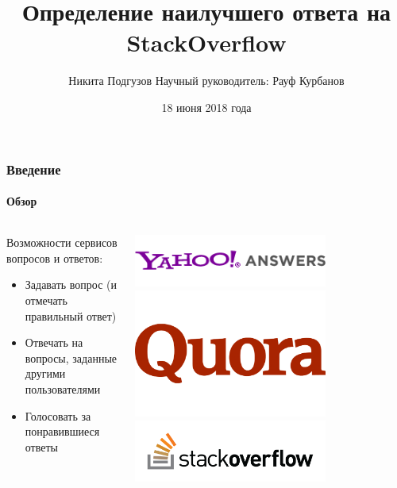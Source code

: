 \documentclass[10pt]{beamer}
\title[Определение наилучшего ответа на SO]{Определение наилучшего ответа на StackOverflow}
\author[Никита Подгузов]{
Никита Подгузов 
\texorpdfstring{\vskip0.5cm \footnotesize{Научный руководитель: Рауф Курбанов}}{}
}
\institute[СПбАУ]{Санкт-Петербургский Академический университет}
\date{18 июня 2018 года}
\begin{document}

\begin{frame}
\titlepage
\end{frame}


\begin{frame}
\frametitle{Введение}
\framesubtitle{Обзор}

\begin{columns}
    \begin{column}{0.6\textwidth}
        Возможности сервисов вопросов и ответов:
        \begin{itemize}
            \item Задавать вопрос (и отмечать правильный ответ) 
            \item Отвечать на вопросы, заданные другими пользователями
            \item Голосовать за понравившиеся ответы
        \end{itemize}
    \end{column}
    \begin{column}{0.4\textwidth}
        \begin{center}
            \includegraphics[width=0.7\textwidth]{images/yahoo_answers_logo.png} \\
            \includegraphics[width=0.7\textwidth]{images/quora_logo.png} \\
            \includegraphics[width=0.7\textwidth]{images/stackoverflow_logo.png}
        \end{center}
    \end{column}
\end{columns}
\end{frame}
\end{document}
